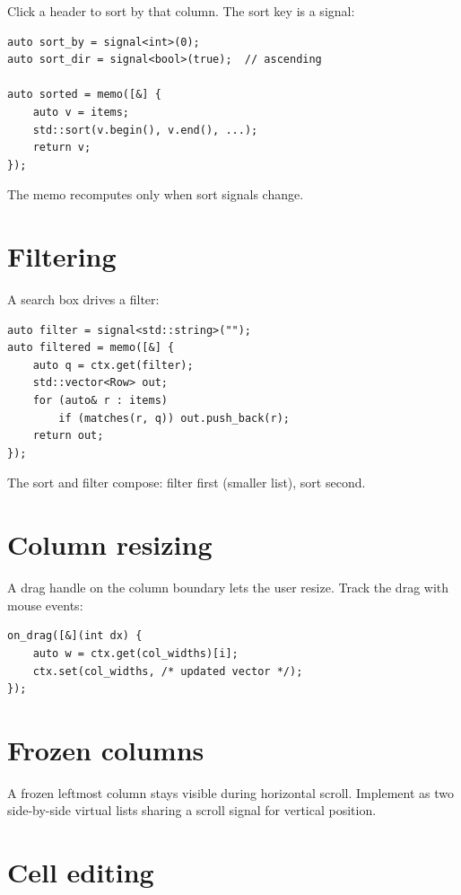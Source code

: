 Click a header to sort by that column. The sort key is a
signal:

\begin{lstlisting}
auto sort_by = signal<int>(0);
auto sort_dir = signal<bool>(true);  // ascending

auto sorted = memo([&] {
    auto v = items;
    std::sort(v.begin(), v.end(), ...);
    return v;
});
\end{lstlisting}

The memo recomputes only when sort signals change.

\section{Filtering}

A search box drives a filter:

\begin{lstlisting}
auto filter = signal<std::string>("");
auto filtered = memo([&] {
    auto q = ctx.get(filter);
    std::vector<Row> out;
    for (auto& r : items)
        if (matches(r, q)) out.push_back(r);
    return out;
});
\end{lstlisting}

The sort and filter compose: filter first (smaller list),
sort second.

\section{Column resizing}

A drag handle on the column boundary lets the user resize.
Track the drag with mouse events:

\begin{lstlisting}
on_drag([&](int dx) {
    auto w = ctx.get(col_widths)[i];
    ctx.set(col_widths, /* updated vector */);
});
\end{lstlisting}

\section{Frozen columns}

A frozen leftmost column stays visible during horizontal
scroll. Implement as two side-by-side virtual lists sharing
a scroll signal for vertical position.

\section{Cell editing}

